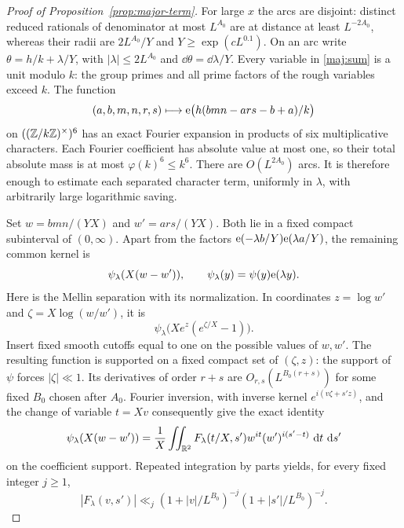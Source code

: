 \begin{proof}[Proof of Proposition~\ref{prop:major-term}]
For large $x$ the arcs are disjoint: distinct reduced rationals of
denominator at most $L^{A_0}$ are at distance at least $L^{-2A_0}$,
whereas their radii are $2L^{A_0}/Y$ and $Y\ge\exp(cL^{0.1})$.
On an arc write $\theta=h/k+\lambda/Y$, with
$|\lambda|\le2L^{A_0}$ and $\dd\theta=\dd\lambda/Y$.
Every variable in \eqref{maj:sum} is a unit modulo $k$: the group
primes and all prime factors of the rough variables exceed $k$.
The function
\[
 (a,b,m,n,r,s)\longmapsto
 \mathrm{e}\big(h(bmn-ars-b+a)/k\big)
\]
on $((\mathbb Z/k\mathbb Z)^\times)^6$ has an exact Fourier expansion in
products of six multiplicative characters.  Each Fourier
coefficient has absolute value at most one, so their total absolute
mass is at most $\varphi(k)^6\le k^6$.  There are $O(L^{2A_0})$
arcs.  It is therefore enough to estimate each separated character
term, uniformly in $\lambda$, with arbitrarily large logarithmic
saving.

Set $w=bmn/(YX)$ and $w'=ars/(YX)$.  Both lie in a fixed compact
subinterval of $(0,\infty)$.  Apart from the factors
$\mathrm{e}(-\lambda b/Y)\mathrm{e}(\lambda a/Y)$, the remaining common kernel is
\[
 \psi_\lambda(X(w-w')),\qquad
 \psi_\lambda(y)=\psi(y)\mathrm{e}(\lambda y).
\]
Here is the Mellin separation with its normalization.  In coordinates
$z=\log w'$ and $\zeta=X\log(w/w')$, it is
\[
 \psi_\lambda\big(Xe^z(e^{\zeta/X}-1)\big).
\]
Insert fixed smooth cutoffs equal to one on the possible values of
$w,w'$.  The resulting function is supported on a fixed compact
set of $(\zeta,z)$: the support of $\psi$ forces $|\zeta|\ll1$.
Its derivatives of order $r+s$ are
$O_{r,s}(L^{B_0(r+s)})$ for some fixed $B_0$ chosen after $A_0$.
Fourier inversion, with inverse kernel $e^{i(v\zeta+s'z)}$, and
the change of variable $t=Xv$ consequently give the exact identity
\begin{equation}\label{maj:Mellin-separation}
 \psi_\lambda(X(w-w'))
 =\frac1X\iint_{\mathbb R^2}
      F_\lambda(t/X,s')w^{it}(w')^{i(s'-t)}\,\,\mathrm d t\,\,\mathrm d s'
\end{equation}
on the coefficient support.  Repeated integration by parts yields,
for every fixed integer $j\ge1$,
\begin{equation}\label{maj:transform-decay}
 |F_\lambda(v,s')|
 \ll_j(1+|v|/L^{B_0})^{-j}(1+|s'|/L^{B_0})^{-j}.
\end{equation}


\end{proof}
